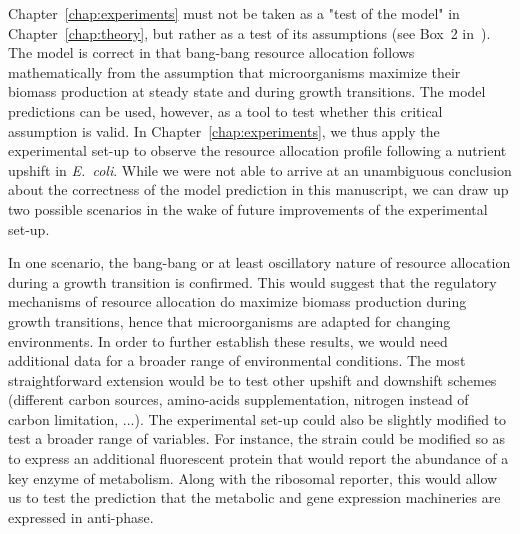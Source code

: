 Chapter~\ref{chap:experiments} must not be taken as a "test of the model" in Chapter~\ref{chap:theory}, but rather as a test of its assumptions (see Box~2 in~\cite{servedio_not_2014}).
The model is correct in that bang-bang resource allocation follows mathematically from the assumption that microorganisms maximize their biomass production at steady state and during growth transitions.
The model predictions can be used, however, as a tool to test whether this critical assumption is valid.
In Chapter~\ref{chap:experiments}, we thus apply the experimental set-up to observe the resource allocation profile following a nutrient upshift in \textit{E.~coli}.
While we were not able to arrive at an unambiguous conclusion about the correctness of the model prediction in this manuscript, we can draw up two possible scenarios in the wake of future improvements of the experimental set-up.

In one scenario, the bang-bang or at least oscillatory nature of resource allocation during a growth transition is confirmed.
This would suggest that the regulatory mechanisms of resource allocation do maximize biomass production during growth transitions, hence that microorganisms are adapted for changing environments.
In order to further establish these results, we would need additional data for a broader range of environmental conditions.
The most straightforward extension would be to test other upshift and downshift schemes (different carbon sources, amino-acids supplementation, nitrogen instead of carbon limitation, ...).
The experimental set-up could also be slightly modified to test a broader range of variables.
For instance, the strain could be modified so as to express an additional fluorescent protein that would report the abundance of a key enzyme of metabolism.
Along with the ribosomal reporter, this would allow us to test the prediction that the metabolic and gene expression machineries are expressed in anti-phase.

